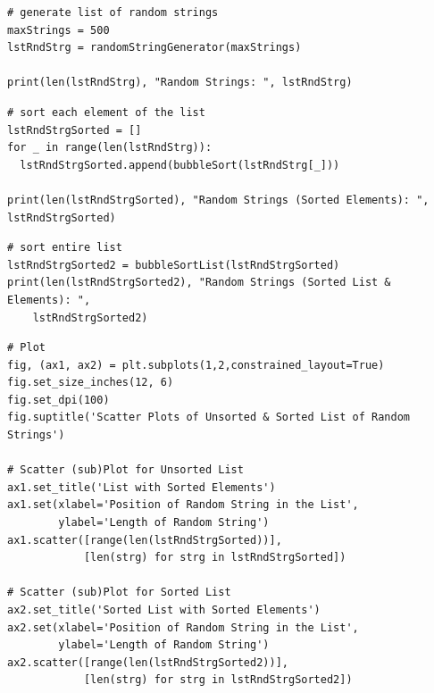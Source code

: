 \documentclass[UTF8, letter]{article}
\begin{document}
\begin{codeblock}
\begin{verbatim}
# generate list of random strings
maxStrings = 500
lstRndStrg = randomStringGenerator(maxStrings)

print(len(lstRndStrg), "Random Strings: ", lstRndStrg)
\end{verbatim}
\end{codeblock}

\vspace{5mm}
\begin{codeblock}
\begin{verbatim}
# sort each element of the list
lstRndStrgSorted = []
for _ in range(len(lstRndStrg)):
  lstRndStrgSorted.append(bubbleSort(lstRndStrg[_]))

print(len(lstRndStrgSorted), "Random Strings (Sorted Elements): ", lstRndStrgSorted)
\end{verbatim}
\end{codeblock}

\vspace{5mm}
\begin{codeblock}
\begin{verbatim}
# sort entire list
lstRndStrgSorted2 = bubbleSortList(lstRndStrgSorted)
print(len(lstRndStrgSorted2), "Random Strings (Sorted List & Elements): ", 
	lstRndStrgSorted2)
\end{verbatim}
\end{codeblock}

\vspace{5mm}
\begin{codeblock}
\begin{verbatim}
# Plot
fig, (ax1, ax2) = plt.subplots(1,2,constrained_layout=True)
fig.set_size_inches(12, 6)
fig.set_dpi(100)
fig.suptitle('Scatter Plots of Unsorted & Sorted List of Random Strings')

# Scatter (sub)Plot for Unsorted List
ax1.set_title('List with Sorted Elements')
ax1.set(xlabel='Position of Random String in the List', 
        ylabel='Length of Random String')
ax1.scatter([range(len(lstRndStrgSorted))], 
            [len(strg) for strg in lstRndStrgSorted])

# Scatter (sub)Plot for Sorted List
ax2.set_title('Sorted List with Sorted Elements')
ax2.set(xlabel='Position of Random String in the List', 
        ylabel='Length of Random String')
ax2.scatter([range(len(lstRndStrgSorted2))], 
            [len(strg) for strg in lstRndStrgSorted2])
\end{verbatim}
\end{codeblock}
\end{document}
